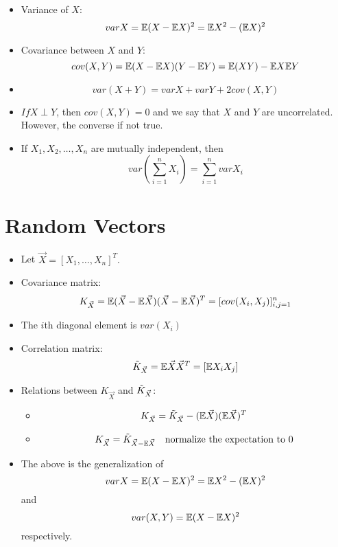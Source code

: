 \documentclass[../main.tex]{subfiles}
\begin{document}
\begin{itemize}
    \item Variance of $X$: \[
    var X = \mathbb{E} (X-\mathbb{E} X)^2 = \mathbb{E} X^2 - (\mathbb{E} X)^2
    \]
    \item Covariance between $X$ and $Y$: \[
    cov(X,Y) = \mathbb{E}(X-\mathbb{E} X)(Y-\mathbb{E} Y) = \mathbb{E}(XY) - \mathbb{E} X\mathbb{E} Y
    \]
    \item \[
    var(X+Y) = var X + var Y + 2cov(X,Y)
    \]
    \item $If X\perp Y$, then $cov(X,Y)=0$ and we say that $X$ and $Y$ are uncorrelated. However, the converse if not true.
    \item If $X_1,X_2,\dots,X_n$ are mutually independent, then \[
    var(\sum_{i=1}^nX_i)=\sum_{i=1}^n var X_i
    \]
\end{itemize}
\section{Random Vectors}
\begin{itemize}
    \item Let $\vec X=[X_1,\dots,X_n]^T.$
    \item Covariance matrix: \[
    K_{\vec X} = \mathbb{E}(\vec X-\mathbb{E} \vec X)(\vec X-\mathbb{E} \vec X)^T = [cov(X_i,X_j)]_{i,j=1}^n
    \]
    \item The $i$th diagonal element is $var(X_i)$
    \item Correlation matrix: \[
    \Tilde{K}_{\vec X} = \mathbb{E} \vec X \vec X^T = [\mathbb{E} X_i X_j]
    \]
    \item Relations between $K_{\vec X}$ and $\Tilde{K}_{\vec X}$:\begin{itemize}
        \item \[
        K_{\vec X} = \Tilde{K}_{\vec X} - (\mathbb{E} \vec X)(\mathbb{E} \vec X)^T
        \]
        \item \[
        K_{\vec X}=\Tilde{K}_{\vec X-\mathbb{E} \vec X} \quad \text{normalize the expectation to $0$}
        \]
    \end{itemize}
    \item The above is the generalization of \[
    var X = \mathbb{E} (X-\mathbb{E} X)^2 = \mathbb{E} X^2 - (\mathbb{E} X)^2
    \] and 
    \[
    var(X,Y) = \mathbb{E}(X - \mathbb{E} X)^2
    \] respectively.
\end{itemize}
\end{document}
